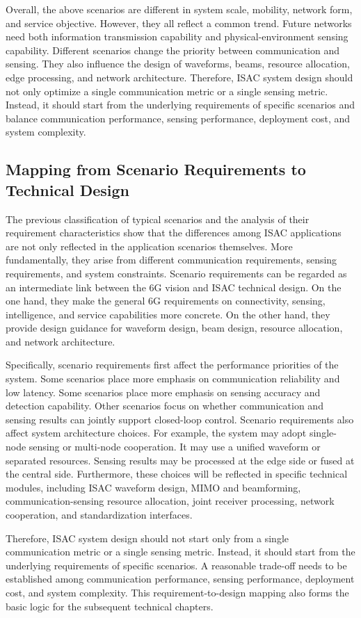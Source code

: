 Overall, the above scenarios are different in system scale, mobility, network form, and service objective.
However, they all reflect a common trend.
Future networks need both information transmission capability and physical-environment sensing capability.
Different scenarios change the priority between communication and sensing.
They also influence the design of waveforms, beams, resource allocation, edge processing, and network architecture.
Therefore, ISAC system design should not only optimize a single communication metric or a single sensing metric.
Instead, it should start from the underlying requirements of specific scenarios and balance communication performance, sensing performance, deployment cost, and system complexity.

\subsection{Mapping from Scenario Requirements to Technical Design}

The previous classification of typical scenarios and the analysis of their requirement characteristics show that the differences among ISAC applications are not only reflected in the application scenarios themselves.
More fundamentally, they arise from different communication requirements, sensing requirements, and system constraints.
Scenario requirements can be regarded as an intermediate link between the 6G vision and ISAC technical design.
On the one hand, they make the general 6G requirements on connectivity, sensing, intelligence, and service capabilities more concrete.
On the other hand, they provide design guidance for waveform design, beam design, resource allocation, and network architecture.

Specifically, scenario requirements first affect the performance priorities of the system.
Some scenarios place more emphasis on communication reliability and low latency.
Some scenarios place more emphasis on sensing accuracy and detection capability.
Other scenarios focus on whether communication and sensing results can jointly support closed-loop control.
Scenario requirements also affect system architecture choices.
For example, the system may adopt single-node sensing or multi-node cooperation.
It may use a unified waveform or separated resources.
Sensing results may be processed at the edge side or fused at the central side.
Furthermore, these choices will be reflected in specific technical modules, including ISAC waveform design, MIMO and beamforming, communication-sensing resource allocation, joint receiver processing, network cooperation, and standardization interfaces.

Therefore, ISAC system design should not start only from a single communication metric or a single sensing metric.
Instead, it should start from the underlying requirements of specific scenarios.
A reasonable trade-off needs to be established among communication performance, sensing performance, deployment cost, and system complexity.
This requirement-to-design mapping also forms the basic logic for the subsequent technical chapters.
